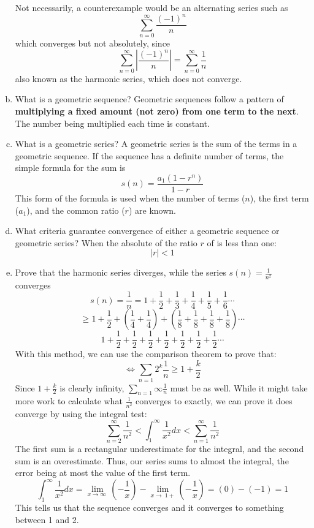 \documentclass{article}
\begin{document}
\begin{enumerate}[a.]
          Not necessarily, a counterexample would be an alternating series such as
          \[\sum_{n=0}^{\infty}\frac{(-1)^n}{n}\]
          which converges but not absolutely, since
          \[\sum_{n=0}^{\infty}|\frac{(-1)^n}{n}| = \sum_{n=0}^{\infty}\frac{1}{n}\]
          also known as the harmonic series, which does not converge.
    \item What is a geometric sequence?
          Geometric sequences follow a pattern of \textbf{multiplying a fixed amount (not zero) from one term to the next}. The number being multiplied each time is constant.
    \item What is a geometric series?
          A geometric series is the sum of the terms in a geometric sequence. If the sequence has a definite number of terms, the simple formula for the sum is
          \[s(n) = \frac{a_1(1-r^n)}{1-r}\]
          This form of the formula is used when the number of terms ($n$), the first term ($a_1$), and the common ratio ($r$) are known.
    \item What criteria guarantee convergence of either a geometric sequence or geometric series?
          When the absolute of the ratio $r$ of is less than one:
          \[|r| < 1\]
    \item Prove that the harmonic series diverges, while the series $s(n) = \frac{1}{n^2} $ converges
          \[s(n) = \frac{1}{n} = 1+\frac{1}{2}+\frac{1}{3}+\frac{1}{4}+\frac{1}{5}+\frac{1}{6}\cdots\]
          \[\geq 1+\frac{1}{2}+(\frac{1}{4}+\frac{1}{4})+(\frac{1}{8}+\frac{1}{8}+\frac{1}{8}+\frac{1}{8})\cdots\]
          \[1+\frac{1}{2}+\frac{1}{2}+\frac{1}{2}+\frac{1}{2}+\frac{1}{2}+\frac{1}{2}+\frac{1}{2}\cdots\]
          With this method, we can use the comparison theorem to prove that:
          \[\iff \sum_{n=1}{2^k}\frac{1}{n}\geq 1+\frac{k}{2}\]
          Since $1+\frac{k}{2}$ is clearly infinity, $\sum_{n=1}{\infty}\frac{1}{n}$ must be as well.
          While it might take more work to calculate what $\frac{1}{n^2}$ converges to exactly, we can prove it does converge by using the integral test:
          \[\sum_{n=2}^{\infty}\frac{1}{n^2}<\int_{1}^{\infty}\frac{1}{x^2}dx<\sum_{n=1}^{\infty}\frac{1}{n^2}\]
          The first sum is a rectangular underestimate for the integral, and the second sum is an overestimate. Thus, our series sums to almost the integral, the error being at most the value of the first term.
          \[\int_{1}^{\infty}\frac{1}{x^2}dx = \lim _{x\to \infty \:}\left(-\frac{1}{x}\right)- \lim _{x\to \:1+}\left(-\frac{1}{x}\right) = (0)-(-1) = 1\]
          This tells us that the sequence converges and it converges to something between 1 and 2.

\end{enumerate}
\end{document}
